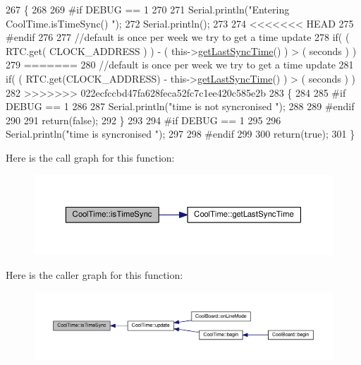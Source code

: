 \begin{DoxyCode}
267 \{
268 
269 \textcolor{preprocessor}{#if DEBUG == 1}
270 
271     Serial.println(\textcolor{stringliteral}{"Entering CoolTime.isTimeSync() "});
272     Serial.println();
273 
274 <<<<<<< HEAD
275 \textcolor{preprocessor}{#endif }
276 
277     \textcolor{comment}{//default is once per week we try to get a time update}
278     \textcolor{keywordflow}{if}( ( RTC.get( CLOCK\_ADDRESS ) ) - ( this->\hyperlink{classCoolTime_a5d17f707a9d337720493b2bce9d41c21}{getLastSyncTime}() ) > ( seconds ) ) 
279 =======
280 \textcolor{comment}{//default is once per week we try to get a time update}
281     \textcolor{keywordflow}{if}( ( RTC.get(CLOCK\_ADDRESS) - this->\hyperlink{classCoolTime_a5d17f707a9d337720493b2bce9d41c21}{getLastSyncTime}() ) > ( seconds ) ) 
282 >>>>>>> 022ecfccbd47fa628feca52fc7c1ee420c585e2b
283     \{
284 
285 \textcolor{preprocessor}{    #if DEBUG == 1 }
286 
287         Serial.println(\textcolor{stringliteral}{"time is not syncronised "});
288     
289 \textcolor{preprocessor}{    #endif}
290 
291         \textcolor{keywordflow}{return}(\textcolor{keyword}{false});  
292     \}
293     
294 \textcolor{preprocessor}{#if DEBUG == 1 }
295 
296     Serial.println(\textcolor{stringliteral}{"time is syncronised "});
297 
298 \textcolor{preprocessor}{#endif }
299 
300     \textcolor{keywordflow}{return}(\textcolor{keyword}{true});
301 \}
\end{DoxyCode}
Here is the call graph for this function\+:
\nopagebreak
\begin{figure}[H]
\begin{center}
\leavevmode
\includegraphics[width=350pt]{classCoolTime_a5ae038a4498602b189f76a10bf02adf8_cgraph}
\end{center}
\end{figure}
Here is the caller graph for this function\+:
\nopagebreak
\begin{figure}[H]
\begin{center}
\leavevmode
\includegraphics[width=350pt]{classCoolTime_a5ae038a4498602b189f76a10bf02adf8_icgraph}
\end{center}
\end{figure}
\mbox{\label{classCoolTime_af355e7f9b3898211cd2ff25eab5933b1}} 
